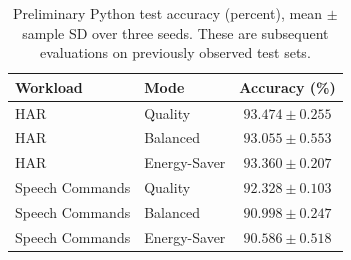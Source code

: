 \begin{table}
\caption{Preliminary Python test accuracy (percent), mean $\pm$ sample SD over three seeds. These are subsequent evaluations on previously observed test sets.}
\label{tab:software-accuracy}
\centering
\begin{tabular}{llc}
\toprule
Workload & Mode & Accuracy (\%) \\
\midrule
HAR & Quality & $93.474 \pm 0.255$ \\
HAR & Balanced & $93.055 \pm 0.553$ \\
HAR & Energy-Saver & $93.360 \pm 0.207$ \\
\midrule
Speech Commands & Quality & $92.328 \pm 0.103$ \\
Speech Commands & Balanced & $90.998 \pm 0.247$ \\
Speech Commands & Energy-Saver & $90.586 \pm 0.518$ \\
\bottomrule
\end{tabular}
\end{table}
